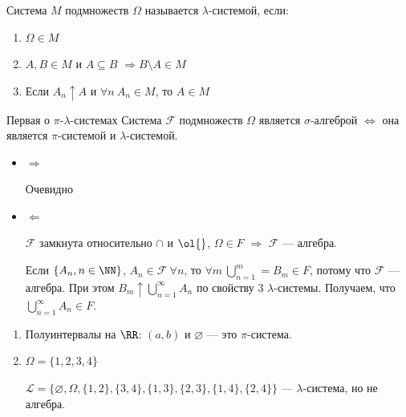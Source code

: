 \begin{defn}{}{}
    Система \( M \) подмножеств \( \Omega \) называется \( \lambda \)-системой, если:
    \begin{enumerate}
        \item
            \( \Omega \in M \)
        \item
            \( A, B \in M \) и \( A \subseteq B \) \( \Rightarrow B \setminus A \in M \)
        \item
            Если \( A_n \uparrow A \) и \( \forall n \ A_n \in M \),
            то \( A \in M \)
    \end{enumerate}
\end{defn}

\begin{thrm}{Первая о \( \pi \)-\( \lambda \)-системах}{}
    Система \( \mathcal{F} \) подмножеств \( \Omega \)
    является \( \sigma \)-алгеброй
    \( \Leftrightarrow \)
    она является \( \pi \)-системой и \( \lambda \)-системой.
\end{thrm}

\begin{itemize}
    \item
        \( \Rightarrow \)

        Очевидно
    \item
        \( \Leftarrow \)

        \( \mathcal{F} \) замкнута относительно \( \cap \) и \( \ol{\space} \), \( \Omega \in F \)
        \( \Rightarrow \) \( \mathcal{F} \) --- алгебра.

        Если \( \{ A_n, n \in \NN \} \),
        \( A_n \in \mathcal{F} \ \forall n \), то
        \( \forall m \ \bigcup\limits_{n = 1}^{m} = B_m \in F \),
        потому что \( \mathcal{F} \) --- алгебра.
        При этом \( B_m \uparrow \bigcup\limits_{n = 1}^{\infty} A_n \)
        по свойству \( 3 \) \( \lambda \)-системы.
        Получаем, что \( \bigcup\limits_{n = 1}^{\infty} A_n \in F \).
\end{itemize}

\begin{example}{}{}
    \begin{enumerate}
        \item
            Полуинтервалы на \( \RR \): \( (a, b) \) и \( \varnothing \) --- это \( \pi \)-система.
        \item
            \( \Omega = \{ 1, 2, 3, 4 \} \)

            \(
                \mathcal{L}
                =
                \{
                    \varnothing, \Omega, \{ 1, 2 \}, \{ 3, 4 \},
                    \{ 1, 3 \}, \{ 2, 3 \}, \{ 1, 4 \}, \{ 2, 4 \}
                \}
            \) --- \( \lambda \)-система, но не алгебра.
    \end{enumerate}
\end{example}

